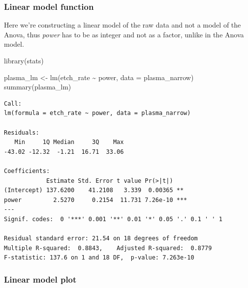 \documentclass[
]{book}
\newenvironment{Shaded}{\begin{snugshade}}{\end{snugshade}}
\newcommand{\AttributeTok}[1]{\textcolor[rgb]{0.77,0.63,0.00}{#1}}
\newcommand{\FunctionTok}[1]{\textcolor[rgb]{0.00,0.00,0.00}{#1}}
\newcommand{\NormalTok}[1]{#1}
\newcommand{\OtherTok}[1]{\textcolor[rgb]{0.56,0.35,0.01}{#1}}
\newcommand{\SpecialCharTok}[1]{\textcolor[rgb]{0.00,0.00,0.00}{#1}}
\begin{document}
\hypertarget{linearModel}{%
\subsubsection{Linear model function}\label{linearModel}}

Here we're constructing a linear model of the raw data and not a model of the Anova, thus \emph{power} has to be as integer and not as a factor, unlike in the Anova model.

\begin{Shaded}
\begin{Highlighting}[]
\FunctionTok{library}\NormalTok{(stats)}
\end{Highlighting}
\end{Shaded}

\begin{Shaded}
\begin{Highlighting}[]
\NormalTok{plasma\_lm }\OtherTok{\textless{}{-}} \FunctionTok{lm}\NormalTok{(etch\_rate }\SpecialCharTok{\textasciitilde{}}\NormalTok{ power, }\AttributeTok{data =}\NormalTok{ plasma\_narrow)}
\FunctionTok{summary}\NormalTok{(plasma\_lm)}
\end{Highlighting}
\end{Shaded}

\begin{verbatim}
Call:
lm(formula = etch_rate ~ power, data = plasma_narrow)

Residuals:
   Min     1Q Median     3Q    Max 
-43.02 -12.32  -1.21  16.71  33.06 

Coefficients:
            Estimate Std. Error t value Pr(>|t|)    
(Intercept) 137.6200    41.2108   3.339  0.00365 ** 
power         2.5270     0.2154  11.731 7.26e-10 ***
---
Signif. codes:  0 '***' 0.001 '**' 0.01 '*' 0.05 '.' 0.1 ' ' 1

Residual standard error: 21.54 on 18 degrees of freedom
Multiple R-squared:  0.8843,	Adjusted R-squared:  0.8779 
F-statistic: 137.6 on 1 and 18 DF,  p-value: 7.263e-10
\end{verbatim}

\hypertarget{linear-model-plot}{%
\subsubsection{Linear model plot}\label{linear-model-plot}}
\end{document}
